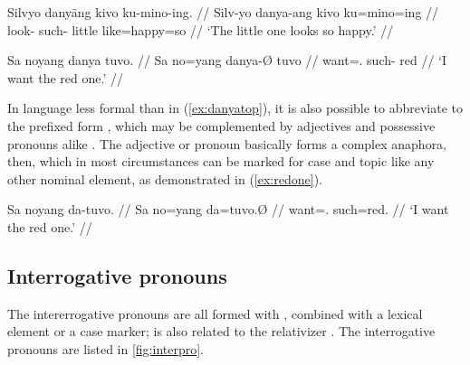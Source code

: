 \pex
\a\begingl
	\gla Silvyo danyāng kivo ku-mino-ing. //
	\glb Silv-yo danya-ang kivo ku=mino=ing //
	\glc look-\TsgN{} such-\Aarg{} little like=happy=so //
	\glft `The little one looks so happy.' //
\endgl

\a\label{ex:danyatop}\begingl
	\gla Sa noyang danya tuvo. //
	\glb Sa no=yang danya-Ø tuvo //
	\glc \PatT{} want=\Fsg{}.\Aarg{} such-\Top{} red //
	\glft `I want the red one.' //
\endgl

\xe


In language less formal than in (\ref{ex:danyatop}), it is also possible to 
abbreviate  to the prefixed form , which may be 
complemented by adjectives and possessive pronouns alike%
. The adjective or pronoun basically forms a complex anaphora, then, which in
most circumstances can be marked for case and topic like any other nominal
element, as demonstrated in (\ref{ex:redone}).

\ex\label{ex:redone}\begingl
	\gla Sa noyang da-tuvo. //
	\glb Sa no=yang da=tuvo.Ø //
	\glc \PatT{} want=\Fsg{}.\Aarg{} such=red.\Top{} //
	\glft `I want the red one.' //
\endgl\xe


\subsection{Interrogative pronouns}
\label{subsec:interpro}

The intererrogative pronouns are all formed with , combined with
a lexical element or a case marker;  is also related to the
relativizer . The interrogative pronouns are listed in
\autoref{fig:interpro}.

